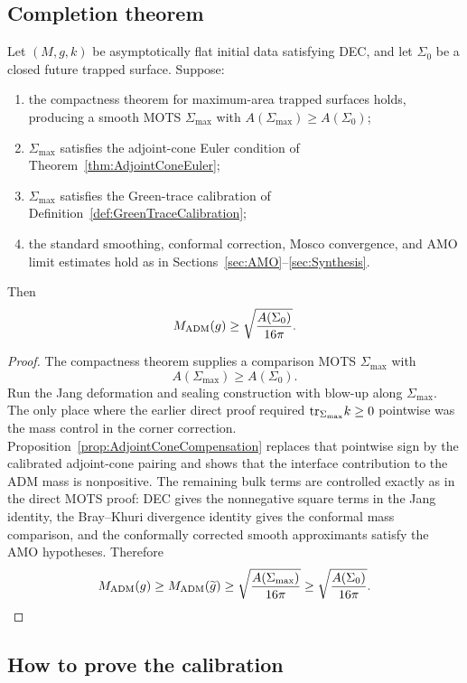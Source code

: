 \subsection{Completion theorem}

\begin{theorem}\label{thm:FullPenroseFromCalibration}
Let \((M,g,k)\) be asymptotically flat initial data satisfying DEC, and let \(\Sigma_0\) be a closed future trapped surface. Suppose:
\begin{enumerate}
    \item the compactness theorem for maximum-area trapped surfaces holds, producing a smooth MOTS \(\Sigma_{\max}\) with \(A(\Sigma_{\max})\ge A(\Sigma_0)\);
    \item \(\Sigma_{\max}\) satisfies the adjoint-cone Euler condition of Theorem~\ref{thm:AdjointConeEuler};
    \item \(\Sigma_{\max}\) satisfies the Green-trace calibration of Definition~\ref{def:GreenTraceCalibration};
    \item the standard smoothing, conformal correction, Mosco convergence, and AMO limit estimates hold as in Sections~\ref{sec:AMO}--\ref{sec:Synthesis}.
\end{enumerate}
Then
\[
    M_{\mathrm{ADM}}(g)\ge \sqrt{\frac{A(\Sigma_0)}{16\pi}}.
\]
\end{theorem}

\begin{proof}
The compactness theorem supplies a comparison MOTS \(\Sigma_{\max}\) with
\[
    A(\Sigma_{\max})\ge A(\Sigma_0).
\]
Run the Jang deformation and sealing construction with blow-up along \(\Sigma_{\max}\). The only place where the earlier direct proof required \(\mathrm{tr}_{\Sigma_{\max}}k\ge0\) pointwise was the mass control in the corner correction. Proposition~\ref{prop:AdjointConeCompensation} replaces that pointwise sign by the calibrated adjoint-cone pairing and shows that the interface contribution to the ADM mass is nonpositive. The remaining bulk terms are controlled exactly as in the direct MOTS proof: DEC gives the nonnegative square terms in the Jang identity, the Bray--Khuri divergence identity gives the conformal mass comparison, and the conformally corrected smooth approximants satisfy the AMO hypotheses. Therefore
\[
    M_{\mathrm{ADM}}(g)
    \ge M_{\mathrm{ADM}}(\widetilde{g})
    \ge \sqrt{\frac{A(\Sigma_{\max})}{16\pi}}
    \ge \sqrt{\frac{A(\Sigma_0)}{16\pi}}.
\]
\end{proof}

\subsection{How to prove the calibration}

